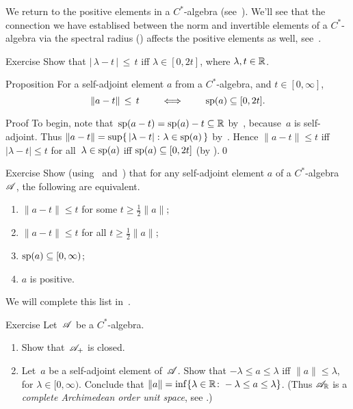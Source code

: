 \documentclass[a]{subfiles}
\begin{document}
\begin{parsec}%
\begin{point}%
We return to the positive elements 
in a $C^*$-algebra (see~).
We'll see that the connection we have establised
between the norm and invertible elements
of a $C^*$-algebra
via the spectral radius ()
affects the positive elements as well, see~.
\end{point}
\begin{point}{Exercise}%
Show that 
$\left|\,\lambda-t\,\right| \,\leq\, t$ iff  $\lambda \in[0,2t]$,
where $\lambda,t\in\mathbb{R}$.
\end{point}
\begin{point}{Proposition}%
For a self-adjoint element $a$ from a $C^*$-algebra,
and $t\in [0,\infty]$, 
\begin{equation*}
\|a-t\|\,\leq\, t\qquad\iff\qquad \mathrm{sp}(a)\subseteq [0,2t].
\end{equation*}%
\begin{point}{Proof}%
To begin, note that~$\mathrm{sp}(a-t)=\mathrm{sp}(a)-t\subseteq \mathbb{R}$ 
by~,
because~$a$ is self-adjoint.
Thus $\|a-t\|=\sup\{\,\left|\lambda-t\right|\colon \lambda\in \mathrm{sp}(a)\,\}$
by~.
Hence $\|a-t\|\leq t$
iff $\left|\lambda-t\right|\leq t$ for all~$\lambda\in\mathrm{sp}(a)$
iff $\mathrm{sp}(a)\subseteq [0,2t]$ (by ).\qed
\end{point}
\begin{point}{Exercise}%
Show
(using~ and~)
that
for any self-adjoint element $a$ of a $C^*$-algebra~$\mathscr{A}$,
the following are equivalent.
\begin{enumerate}
\item 
\label{cstar-pos-1}
$\|a-t\|\leq t$
for some $t\geq \frac{1}{2}\|a\|$;
\item 
\label{cstar-pos-2}
$\|a-t\|\leq t$
for all $t\geq \frac{1}{2}\|a\|$;
\item 
\label{cstar-pos-3}
$\mathrm{sp}(a)\subseteq[0,\infty)$;
\item
$a$ is positive.
\end{enumerate}
We will complete this list in~.
\end{point}
\end{point}
\begin{point}{Exercise}%
Let~$\mathscr{A}$ be a $C^*$-algebra.
\begin{enumerate}
\item
Show that~$\mathscr{A}_{+}$ is closed.
\item
Let~$a$ be a self-adjoint element of~$\mathscr{A}$.
Show that
 $-\lambda \leq a\leq \lambda$
iff $\|a\|\leq \lambda$,
for $\lambda\in [0,\infty)$.
Conclude that $\|a\| = \inf\{ \lambda \in \mathbb{R}\colon 
-\lambda \leq a\leq \lambda\}$.
(Thus $\mathscr{A}_{\mathbb{R}}$ is a \emph{complete Archimedean order unit space},
see \TODO{}.)


\end{enumerate}
\end{point}
\end{parsec}
\end{document}
